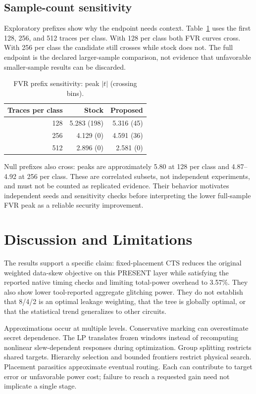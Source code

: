 \documentclass[conference]{IEEEtran}
\begin{document}
\subsection{Sample-count sensitivity}
Exploratory prefixes show why the endpoint needs context. Table~\ref{tab:prefix} uses the first 128, 256, and 512 traces per class. With 128 per class both FVR curves cross. With 256 per class the candidate still crosses while stock does not. The full endpoint is the declared larger-sample comparison, not evidence that unfavorable smaller-sample results can be discarded.
\begin{table}[!t]
\caption{FVR prefix sensitivity: peak $|t|$ (crossing bins).}\label{tab:prefix}
\centering\begin{tabular}{rrr}\hline
Traces per class & Stock & Proposed\\\hline
128 & 5.283 (198) & 5.316 (45)\\
256 & 4.129 (0) & 4.591 (36)\\
512 & 2.896 (0) & 2.581 (0)\\\hline
\end{tabular}
\end{table}

Null prefixes also cross: peaks are approximately 5.80 at 128 per class and 4.87--4.92 at 256 per class. These are correlated subsets, not independent experiments, and must not be counted as replicated evidence. Their behavior motivates independent seeds and sensitivity checks before interpreting the lower full-sample FVR peak as a reliable security improvement.

\section{Discussion and Limitations}
The results support a specific claim: fixed-placement CTS reduces the original weighted data-skew objective on this PRESENT layer while satisfying the reported native timing checks and limiting total-power overhead to 3.57\%. They also show lower tool-reported aggregate glitching power. They do not establish that 8/4/2 is an optimal leakage weighting, that the tree is globally optimal, or that the statistical trend generalizes to other circuits.

Approximations occur at multiple levels. Conservative marking can overestimate secret dependence. The LP translates frozen windows instead of recomputing nonlinear slew-dependent responses during optimization. Group splitting restricts shared targets. Hierarchy selection and bounded frontiers restrict physical search. Placement parasitics approximate eventual routing. Each can contribute to target error or unfavorable power cost; failure to reach a requested gain need not implicate a single stage.
\end{document}
